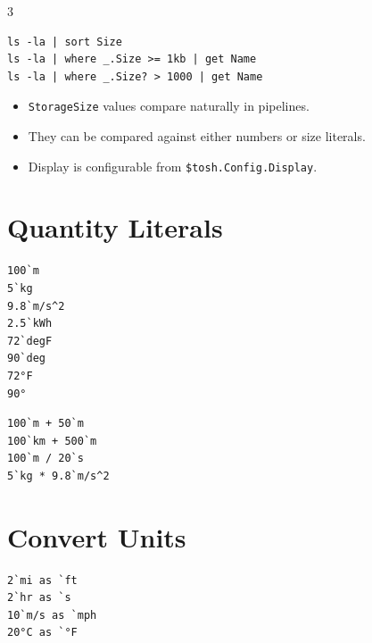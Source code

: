 \begin{multicols*}{3}
\begin{lstlisting}
ls -la | sort Size
ls -la | where _.Size >= 1kb | get Name
ls -la | where _.Size? > 1000 | get Name
\end{lstlisting}

\begin{itemize}
\item \texttt{StorageSize} values compare naturally in pipelines.
\item They can be compared against either numbers or size literals.
\item Display is configurable from \texttt{\$tosh.Config.Display}.
\end{itemize}

\columnbreak

\section{Quantity Literals}
\begin{lstlisting}
100`m
5`kg
9.8`m/s^2
2.5`kWh
72`degF
90`deg
72°F
90°
\end{lstlisting}


\begin{lstlisting}
100`m + 50`m
100`km + 500`m
100`m / 20`s
5`kg * 9.8`m/s^2
\end{lstlisting}


\section{Convert Units}
\begin{lstlisting}
2`mi as `ft
2`hr as `s
10`m/s as `mph
20°C as `°F


\end{lstlisting}
\end{multicols*}
